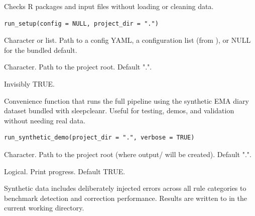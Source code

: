 \documentclass[a4paper]{book}
\begin{document}
%
\begin{Description}
Checks R packages and input files without loading or cleaning data.
\end{Description}
%
\begin{Usage}
\begin{verbatim}
run_setup(config = NULL, project_dir = ".")
\end{verbatim}
\end{Usage}
%
\begin{Arguments}
\begin{ldescription}
\item[\code{config}] Character or list. Path to a config YAML, a configuration
list (from ), or NULL for the bundled default.

\item[\code{project\_dir}] Character. Path to the project root. Default ".".
\end{ldescription}
\end{Arguments}
%
\begin{Value}
Invisibly TRUE.
\end{Value}
%
\begin{Description}
Convenience function that runs the full pipeline using the synthetic
EMA diary dataset bundled with sleepcleanr. Useful for testing, demos,
and validation without needing real data.
\end{Description}
%
\begin{Usage}
\begin{verbatim}
run_synthetic_demo(project_dir = ".", verbose = TRUE)
\end{verbatim}
\end{Usage}
%
\begin{Arguments}
\begin{ldescription}
\item[\code{project\_dir}] Character. Path to the project root (where output/ will be created).
Default ".".

\item[\code{verbose}] Logical. Print progress. Default TRUE.
\end{ldescription}
\end{Arguments}
%
\begin{Details}
Synthetic data includes deliberately injected errors across all rule categories
to benchmark detection and correction performance. Results are written to
 in the current working directory.
\end{Details}
\end{document}

